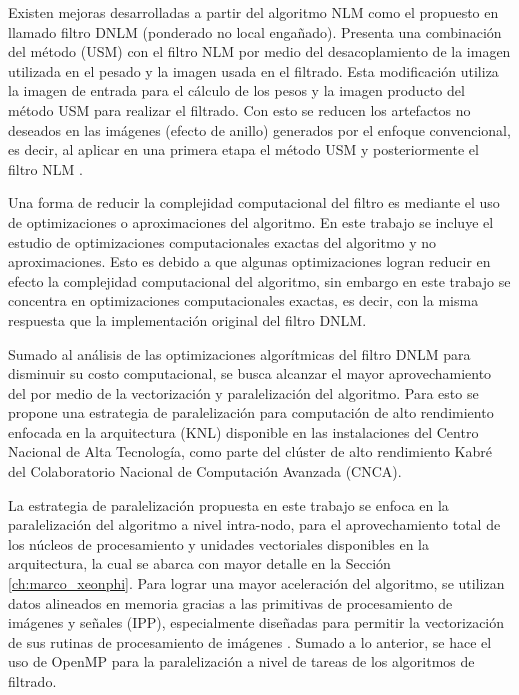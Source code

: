Existen mejoras desarrolladas a partir del algoritmo NLM como el propuesto en \cite{calderon2015dewaff} llamado filtro DNLM  (ponderado no local enga\~nado). Presenta una combinación del método  (USM) con el filtro NLM por medio del desacoplamiento de la imagen utilizada en el pesado y la imagen usada en el filtrado. Esta modificación utiliza la imagen de entrada para el cálculo de los pesos y la imagen producto del método USM para realizar el filtrado. Con esto se reducen los artefactos no deseados en las imágenes (efecto de anillo) generados por el enfoque convencional, es decir, al aplicar en una primera etapa el método USM y posteriormente el filtro NLM \cite{calderon2015dewaff}.  


Una forma de reducir la complejidad computacional del filtro es mediante el uso de optimizaciones o aproximaciones del algoritmo. En este trabajo se incluye el estudio de optimizaciones computacionales exactas del algoritmo y no aproximaciones. Esto es debido a que algunas optimizaciones logran reducir en efecto la complejidad computacional del algoritmo, sin embargo en este trabajo se concentra en optimizaciones computacionales exactas, es decir, con la misma respuesta que la implementación original del filtro DNLM. 

Sumado al análisis de las optimizaciones algorítmicas del filtro DNLM para disminuir su costo computacional, se busca alcanzar el mayor aprovechamiento del  por medio de la vectorización y paralelización del algoritmo. Para esto se propone una estrategia de paralelización para computación de alto rendimiento enfocada en la arquitectura  (KNL) disponible en las instalaciones del Centro Nacional de Alta Tecnología, como parte del clúster de alto rendimiento Kabré del Colaboratorio Nacional de Computación Avanzada (CNCA).

La estrategia de paralelización propuesta en este trabajo se enfoca en la paralelización del algoritmo a nivel intra-nodo, para el aprovechamiento total de los núcleos de procesamiento y unidades vectoriales disponibles en la arquitectura, la cual se abarca con mayor detalle en la Sección \ref{ch:marco_xeonphi}. 
Para lograr una mayor aceleración del algoritmo, se utilizan datos alineados en memoria gracias a las primitivas de procesamiento de imágenes y se\~nales  (IPP), especialmente dise\~nadas para permitir la vectorización de sus rutinas de procesamiento de imágenes \cite{IntelCorporation2017}. Sumado a lo anterior, se hace el uso de OpenMP para la paralelización a nivel de tareas de los algoritmos de filtrado. 

